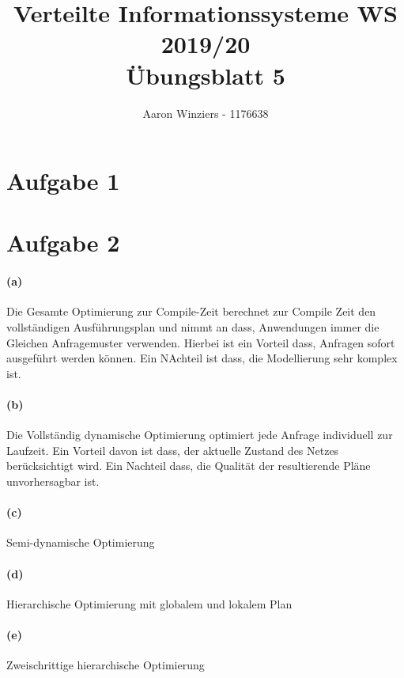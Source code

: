 \documentclass[11pt,a4paper,parskip=half ]{scrartcl}
\author{Aaron Winziers - 1176638}
\title{Verteilte Informationssysteme WS 2019/20\\\LARGE{Übungsblatt 5}}
\begin{document}
	\maketitle
	
	\section*{Aufgabe 1}
	\section*{Aufgabe 2}
	\paragraph{(a)} Die Gesamte Optimierung zur Compile-Zeit berechnet zur Compile Zeit den vollständigen Ausführungsplan und nimmt an dass, Anwendungen immer die Gleichen Anfragemuster verwenden. Hierbei ist ein Vorteil dass, Anfragen sofort ausgeführt werden können. Ein NAchteil ist dass, die Modellierung sehr komplex ist.
	\paragraph{(b)} Die Vollständig dynamische Optimierung optimiert jede Anfrage individuell zur Laufzeit. Ein Vorteil davon ist dass, der aktuelle Zustand des Netzes berücksichtigt wird. Ein Nachteil dass, die Qualität der resultierende Pläne unvorhersagbar ist.
	\paragraph{(c)} Semi-dynamische Optimierung
	\paragraph{(d)} Hierarchische Optimierung mit globalem und lokalem Plan
	\paragraph{(e)} Zweischrittige hierarchische Optimierung
	
\end{document}
